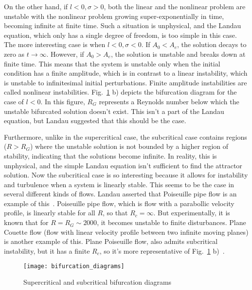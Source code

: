 On the other hand, if $l<0, \sigma>0$, both the linear and the nonlinear problem are unstable with the nonlinear problem growing super-exponentially in time, becoming infinite at finite time.
Such a situation is unphysical, and the Landau equation, which only has a single degree of freedom, is too simple in this case. 
The more interesting case is when $l<0, \sigma<0$. If $A_0 < A_e$, the solution
decays to zero as $t \rightarrow \infty$. However, if $A_0 > A_e$, the solution is unstable and breaks down at finite time. This means that the system is unstable only when the initial
condition has a finite amplitude, which is in contrast to a linear instability, which is unstable to infinitesimal initial perturbations. Finite amplitude instabilities are called nonlinear
instabilities. Fig.~\ref{bifurcation_diagrams} b) depicts the bifurcation diagram
for the case of $l<0$. In this figure, $R_G$ represents a Reynolds number below which the unstable bifurcated solution doesn't exist. This isn't a part of the Landau equation, but Landau
suggested that this should be the case. 

Furthermore, unlike in the supercritical case, the subcritical case contains regions ($R>R_G$) where the unstable solution is not bounded by a higher
region of stability, indicating that the solutions become infinite. In reality, this is unphysical, and the simple Landau equation isn't sufficient to find the attractor solution.
Now the subcritical case is so interesting because it allows for instability and turbulence when a system is linearly stable. This seems
to be the case in several different kinds of flows. Landau asserted that Poiseuille pipe flow is an example of this~\cite{landau1944}. 
Poiseuille pipe flow, which is flow with a parabollic velocity profile, is linearly stable for all $R$, so that $R_c = \infty$. 
But experimentally, it is known that for $R = R_G \sim 2000$, it becomes unstable to finite disturbances. Plane Couette flow (flow with linear velocity profile between two infinite moving planes)
is another example of this. Plane Poiseuille flow, also admits subcritical instability, but it has a finite $R_c$, so it's more representative of Fig.~\ref{bifurcation_diagrams} b)~\cite{trefethen1993}.

\begin{figure}
\centerline{\texttt{[image: bifurcation\_diagrams]}}
\caption{Supercritical and subcritical bifurcation diagrams}
\label{bifurcation_diagrams}
\end{figure}

